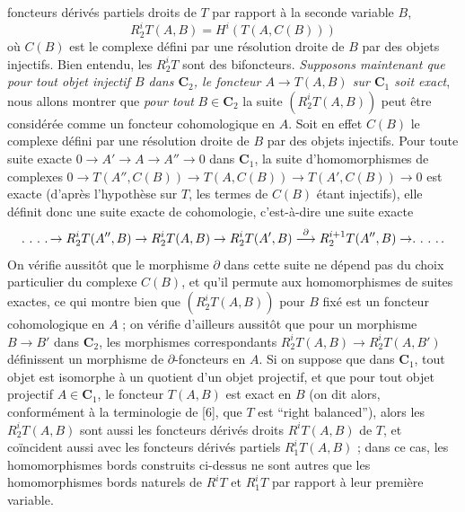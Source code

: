 
\noindent foncteurs dérivés partiels droits de $T$ par rapport à la seconde
variable $B$,
\[
 R_2^iT(A,B)=H^i(T(A,C(B)))
\]
où $C(B)$ est le complexe défini par une résolution droite de $B$ par des
objets injectifs. Bien entendu, les $R_2^iT$ sont des bifoncteurs.
\textit{Supposons maintenant que pour tout objet injectif $B$ dans $\mathbf{C}_2$, le
foncteur $A\to T(A,B)$ sur $\mathbf{C}_1$ soit exact}, nous allons montrer
que \textit{pour tout} $B\in \mathbf{C}_2$ la suite $(R_2^iT(A,B))$ peut être considérée comme un
foncteur cohomologique en $A$. Soit en effet $C(B)$ le complexe défini par une
résolution droite de $B$ par des objets injectifs. Pour toute suite exacte
$0\to A'\to A\to A''\to0$
dans $\mathbf{C}_1$, la suite d'homomorphismes de complexes
$0\to T(A'',C(B))\to T(A,C(B))
 \to T(A',C(B))\to0$
est exacte (d'après l'hypothèse sur $T$, les termes de $C(B)$ étant injectifs),
elle définit donc une suite exacte de cohomologie, c'est-à-dire une suite
exacte
\[
\ldotp\,\ldotp\,\ldotp\,\ldotp\to R_2^iT(A'',B)\to R_2^iT(A,B)
\to R_2^iT(A',B)
\mathrel{\mathop{\longrightarrow}\limits^{\partial}}R_2^{i+1}T(A'',B)
\to\ldotp\,\ldotp\,\ldotp\,\ldotp .
\]
On vérifie aussitôt que le morphisme $\partial$ dans cette suite ne dépend pas
du choix particulier du complexe $C(B)$, et qu'il permute aux homomorphismes
de suites exactes, ce qui montre bien que $(R_2^iT(A,B))$ pour $B$ fixé est un
foncteur cohomologique en $A$ ; on vérifie d'ailleurs aussitôt que pour un
morphisme $B\to B'$ dans $\mathbf{C}_2$, les morphismes correspondants
$R_2^iT(A,B)\to R_2^iT(A,B')$ définissent un morphisme de
$\partial$-foncteurs en $A$.
Si on suppose que dans $\mathbf{C}_1$, tout objet est isomorphe à un quotient d'un objet
projectif, et que pour tout objet projectif $A\in \mathbf{C}_1$, le foncteur $T(A,B)$
est exact en $B$ (on dit alors, conformément à la terminologie de [6], que $T$
est ``right balanced''), alors les $R_2^iT(A,B)$ sont aussi les foncteurs
dérivés droits $R^iT(A,B)$ de $T$, et coïncident aussi avec les foncteurs
dérivés partiels $R_1^iT(A,B)$ ; dans ce cas, les homomorphismes bords
construits ci-dessus ne sont autres que les homomorphismes bords naturels de
$R^iT$ et $R_1^iT$ par rapport à leur première variable.


